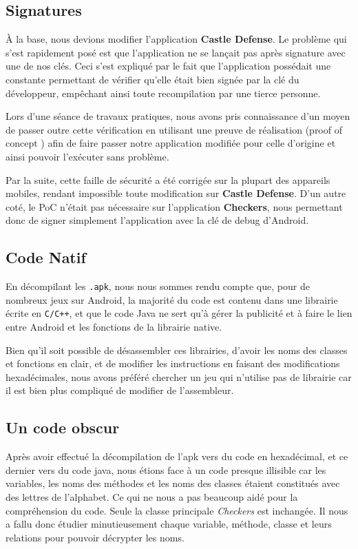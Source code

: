 \subsection{Signatures}

À la base, nous devions modifier l'application \textbf{Castle Defense}.
Le problème qui s'est rapidement posé est que l'application ne se lançait pas après signature avec une de nos clés.
Ceci s'est expliqué par le fait que l'application possédait une constante permettant de vérifier qu'elle était bien signée par la clé du développeur,
empêchant ainsi toute recompilation par une tierce personne.

Lors d'une séance de travaux pratiques, nous avons pris connaissance d'un moyen de passer outre cette vérification en utilisant une preuve de réalisation
(proof of concept \cite{PoC}) afin de faire passer notre application modifiée pour celle d'origine et ainsi pouvoir l'exécuter sans problème.

Par la suite, cette faille de sécurité a été corrigée sur la plupart des appareils mobiles,
rendant impossible toute modification sur \textbf{Castle Defense}.
D'un autre coté, le PoC n'était pas nécessaire sur l'application \textbf{Checkers},
nous permettant donc de signer simplement l'application avec la clé de debug d'Android.


\subsection{Code Natif}

En décompilant les \texttt{.apk}, nous nous sommes rendu compte que, pour de nombreux jeux sur Android, la majorité du code est contenu dans une librairie écrite en \texttt{C/C++}, et que le code Java ne sert qu'à gérer la publicité et à faire le lien entre Android et les fonctions de la librairie native.

Bien qu'il soit possible de désassembler ces librairies, d'avoir les noms des classes et fonctions en clair, et de modifier les instructions en faisant des modifications hexadécimales, nous avons préféré chercher un jeu qui n'utilise pas de librairie car il est bien plus compliqué de modifier de l'assembleur.


\subsection{Un code obscur}
Après avoir effectué la décompilation de l'apk vers du code en hexadécimal, et ce dernier vers du code java, nous étions face à un code presque illisible car les variables, les noms des méthodes et les noms des classes étaient constitués avec des lettres de l'alphabet. Ce qui ne nous a pas beaucoup aidé pour la compréhension du code.
Seule la classe principale \textit{Checkers} est inchangée. Il nous a fallu donc étudier minutieusement chaque variable, méthode, classe et leurs relations pour pouvoir décrypter les noms.
